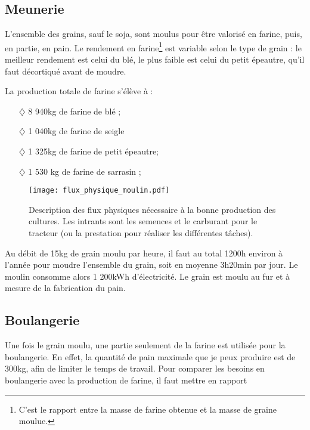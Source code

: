 \documentclass{book}
\begin{document}
\subsection{Meunerie}

L'ensemble des grains, sauf le soja, sont moulus pour être valorisé en farine, puis, en partie, en pain. Le rendement en farine\footnote{C'est le rapport entre la masse de farine obtenue et la masse de graine moulue.} est variable selon le type de grain : le meilleur rendement est celui du blé, le plus faible est celui du petit épeautre, qu'il faut décortiqué avant de moudre.

La production totale de farine s'élève à :
\begin{itemize}

\item[$\diamondsuit$] 8 940kg de farine de blé ; 
\item[$\diamondsuit$] 1 040kg de farine de seigle
\item[$\diamondsuit$] 1 325kg de farine de petit épeautre; 
\item[$\diamondsuit$] 1 530 kg de farine de sarrasin ; 

\end{itemize}

\begin{figure}[h!]
\begin{center}
	\texttt{[image: flux\_physique\_moulin.pdf]}
	\caption{Description des flux physiques nécessaire à la bonne production des cultures. Les intrants sont les semences et le carburant pour le tracteur (ou la prestation pour réaliser les différentes tâches).}
	\label{fig:flux_moulin}
\end{center}
\end{figure}

Au débit de 15kg de grain moulu par heure, il faut au total 1200h environ à l'année pour moudre l'ensemble du grain, soit en moyenne 3h20min par jour. Le moulin consomme alors 1 200kWh d'électricité. Le grain est moulu au fur et à mesure de la fabrication du pain. 

\subsection{Boulangerie}

Une fois le grain moulu, une partie seulement de la farine est utilisée pour la boulangerie. En effet, la quantité de pain maximale que je peux produire est de 300kg, afin de limiter le temps de travail. Pour comparer les besoins en boulangerie avec la production de farine, il faut mettre en rapport 
\end{document}
